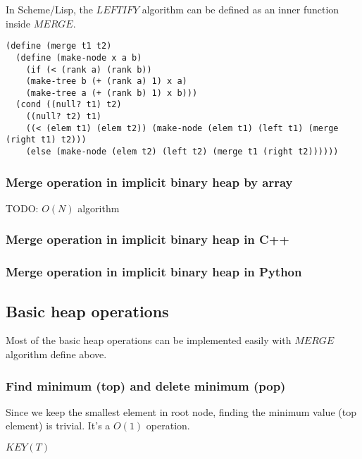 \documentclass{article}
\begin{document}
In Scheme/Lisp, the $LEFTIFY$ algorithm can be defined as an
inner function inside $MERGE$.

\lstset{language=lisp}
\begin{lstlisting}
(define (merge t1 t2)
  (define (make-node x a b)
    (if (< (rank a) (rank b))
	(make-tree b (+ (rank a) 1) x a)
	(make-tree a (+ (rank b) 1) x b)))
  (cond ((null? t1) t2)
	((null? t2) t1)
	((< (elem t1) (elem t2)) (make-node (elem t1) (left t1) (merge (right t1) t2)))
	(else (make-node (elem t2) (left t2) (merge t1 (right t2))))))
\end{lstlisting}

\subsubsection{Merge operation in implicit binary heap by array}

TODO: $O(N)$ algorithm

\subsubsection*{Merge operation in implicit binary heap in C++}

\subsubsection*{Merge operation in implicit binary heap in Python}

\subsection{Basic heap operations}

Most of the basic heap operations can be implemented easily with $MERGE$
algorithm define above.

\subsubsection{Find minimum (top) and delete minimum (pop)}
Since we keep the smallest element in root node, finding the minimum
value (top element) is trivial. It's a $O(1)$ operation.

\begin{algorithmic}[1]
  \State \Return $KEY(T)$
\EndFunction
\end{algorithmic}
\end{document}

